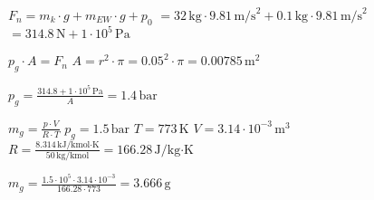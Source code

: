 \( F_n = m_k \cdot g + m_{EW} \cdot g + p_0 \)  
\( = 32 \, \text{kg} \cdot 9.81 \, \text{m/s}^2 + 0.1 \, \text{kg} \cdot 9.81 \, \text{m/s}^2 \)  
\( = 314.8 \, \text{N} + 1 \cdot 10^5 \, \text{Pa} \)  

\( p_g \cdot A = F_n \)  
\( A = r^2 \cdot \pi = 0.05^2 \cdot \pi = 0.00785 \, \text{m}^2 \)  

\( p_g = \frac{314.8 + 1 \cdot 10^5 \, \text{Pa}}{A} = 1.4 \, \text{bar} \)  

\( m_g = \frac{p \cdot V}{R \cdot T} \)  
\( p_g = 1.5 \, \text{bar} \)  
\( T = 773 \, \text{K} \)  
\( V = 3.14 \cdot 10^{-3} \, \text{m}^3 \)  
\( R = \frac{8.314 \, \text{kJ/kmol·K}}{50 \, \text{kg/kmol}} = 166.28 \, \text{J/kg·K} \)  

\( m_g = \frac{1.5 \cdot 10^5 \cdot 3.14 \cdot 10^{-3}}{166.28 \cdot 773} = 3.666 \, \text{g} \)